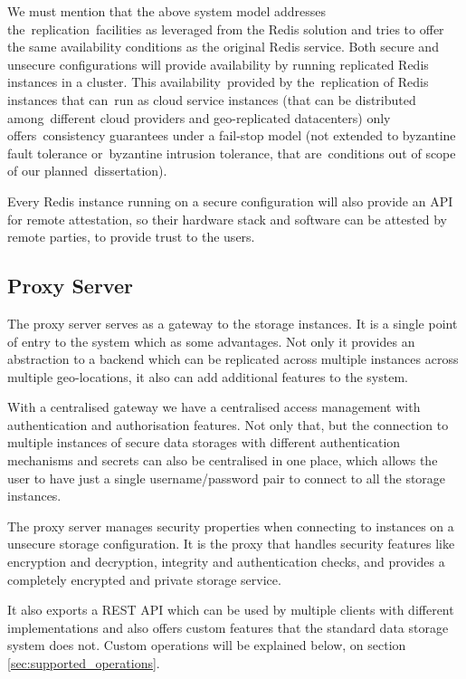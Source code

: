 We must mention that the above system model addresses the replication facilities as leveraged from the Redis solution and tries to offer the same availability conditions as the original Redis service. Both secure and unsecure configurations will provide availability by running replicated Redis instances in a cluster. This availability provided by the replication of Redis instances that can run as cloud service instances (that can be distributed among different cloud providers and geo-replicated datacenters) only offers consistency guarantees under a fail-stop model (not extended to byzantine fault tolerance or byzantine intrusion tolerance, that are conditions out of scope of our planned dissertation).

Every Redis instance running on a secure configuration will also provide an API for remote attestation, so their hardware stack and software can be attested by remote parties, to provide trust to the users.

\subsection{Proxy Server}
\label{ssec:system_model_proxy_server}

The proxy server serves as a gateway to the storage instances. It is a single point of entry to the system which as some advantages. Not only it provides an abstraction to a backend which can be replicated across multiple instances across multiple geo-locations, it also can add additional features to the system. 

With a centralised gateway we have a centralised access management with authentication and authorisation features. Not only that, but the connection to multiple instances of secure data storages with different authentication mechanisms and secrets can also be centralised in one place, which allows the user to have just a single username/password pair to connect to all the storage instances.

The proxy server manages security properties when connecting to instances on a unsecure storage configuration. It is the proxy that handles security features like encryption and decryption, integrity and authentication checks, and provides a completely encrypted and private storage service.

It also exports a \gls{REST} \gls{API} which can be used by multiple clients with different implementations and also offers custom features that the standard data storage system does not. Custom operations will be explained below, on section \ref{sec:supported_operations}.

